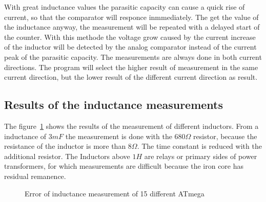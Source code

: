 With great inductance values the parasitic capacity can cause a quick rise of current, so that the comparator
will responce inmmediately.
The get the value of the inductance anyway, the measurement will be repeated with a delayed start of the counter.
With this methode the voltage grow caused by the current increase of the inductor will be detected by the
analog comparator instead of the current peak of the parasitic capacity.
The measurements are always done in both current directions.
The program will select the higher result of measurement in the same current direction, but the
lower result of the different current direction as result.

\subsection{Results of the inductance measurements}
The figure~\ref{fig:Induct328p} shows the results of the measurement of different inductors.
From a inductance of \(3 mF\) the measurement is done with the \(680 \Omega\) resistor, because
the resistance of the inductor is more than \(8 \Omega\). The time constant is reduced with the
additional resistor.
The Inductors above \(1 H\) are relays or primary sides of power transformers, for which
measurements are difficult because the iron core has residual remanence.


\begin{figure}[H]
\centering

\caption{Error of inductance measurement of 15 different ATmega}
\label{fig:Induct328p}
\end{figure}

